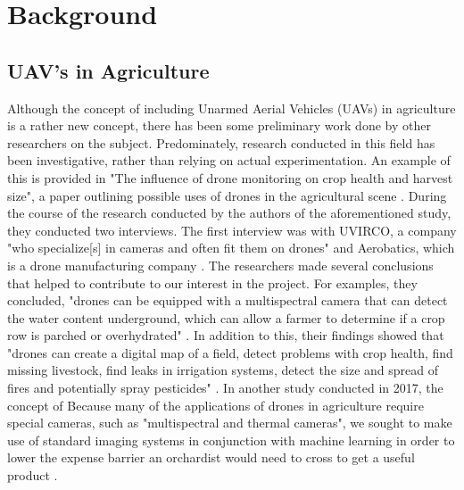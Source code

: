 \section{Background}
\subsection{UAV's in Agriculture}
Although the concept of including Unarmed Aerial Vehicles (UAVs) in agriculture is a rather new concept, there has been some preliminary work done by other researchers on the subject.
Predominately, research conducted in this field has been investigative, rather than relying on actual experimentation.
An example of this is provided in "The influence of drone monitoring on crop health and harvest size", a paper outlining possible uses of drones in the agricultural scene \cite{Reinecke2017}.
During the course of the research conducted by the authors of the aforementioned study, they conducted two interviews. 
The first interview was with UVIRCO, a company "who specialize[s] in cameras and often fit them on drones" and Aerobatics, which is a drone manufacturing company \cite{Reinecke2017}.
The researchers made several conclusions that helped to contribute to our interest in the project.
For examples, they concluded, "drones can be equipped with a multispectral camera that can detect the water content underground, which can allow a farmer to determine if a crop row is parched or overhydrated" \cite{Reinecke2017}.
In addition to this, their findings showed that "drones can create a digital map of a field, detect problems with crop health, find missing livestock, find leaks in irrigation systems, detect the size and spread of fires and potentially spray pesticides" \cite{Reinecke2017}.
In another study conducted in 2017, the concept of 
Because many of the applications of drones in agriculture require special cameras, such as "multispectral and thermal cameras", we sought to make use of standard imaging systems in conjunction with machine learning in order to lower the expense barrier an orchardist would need to cross to get a useful product \cite{Reinecke2017}.
